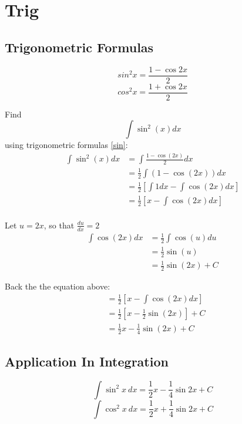 \section{Trig}
	\subsection{Trigonometric Formulas}
	\begin{multicols}{2}
	\noindent
	\begin{equation}
	\label{sin}
	sin^2x=\frac{1-\cos{2x}}{2}
	\end{equation}
	\begin{equation}
	cos^2x=\frac{1+\cos{2x}}{2}
	\end{equation}
	\end{multicols}
	
	\begin{simple}{}{}
	Find
	$$\int\sin^2{(x)}dx$$
	using trigonometric formulas \ref{sin}:
	\begin{align*}
	    \int\sin^2{(x)}dx&=\int\frac{1-\cos{(2x)}}{2}dx\\
	    &=\frac{1}{2}\int(1-\cos{(2x)})dx\\
	    &=\frac{1}{2}\left[\int1dx-\int\cos{(2x)}dx\right]\\
	    &=\frac{1}{2}\left[x-\int\cos{(2x)}dx\right]\\
	\end{align*}
	
	Let $u=2x$, so that $\frac{du}{dx}=2$
	\begin{align*}
	    \int\cos{(2x)}dx&=\frac{1}{2}\int\cos{(u)}du\\
	    &=\frac{1}{2}\sin{(u)}\\
	    &=\frac{1}{2}\sin{(2x)}+C
	\end{align*}
	
	Back the the equation above:
	\begin{align*}
	    &=\frac{1}{2}\left[x-\int\cos{(2x)}dx\right]\\
	    &=\frac{1}{2}\left[x-\frac{1}{2}\sin{(2x)}\right]+C\\
	    &=\frac{1}{2}x-\frac{1}{4}\sin{(2x)}+C
	\end{align*}
	\end{simple}
	
	\subsection{Application In Integration}
	\begin{equation}
	\int\sin^2{x}\ dx=\frac{1}{2}x-\frac{1}{4}\sin{2x}+C
	\end{equation}
	\begin{equation}
	\int\cos^2{x}\ dx=\frac{1}{2}x+\frac{1}{4}\sin{2x}+C
	\end{equation}
	
